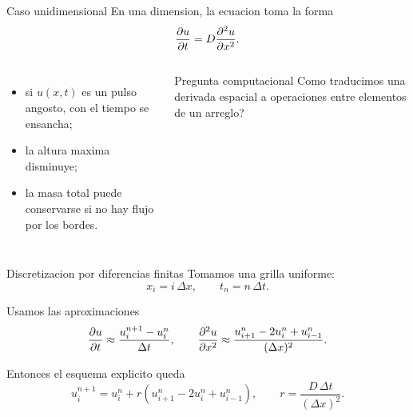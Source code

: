 \begin{frame}{Caso unidimensional}
En una dimension, la ecuacion toma la forma
\[
\pdv{u}{t} = D \pdv[2]{u}{x}.
\]

\begin{columns}[T,onlytextwidth]
\begin{itemize}
    \item si $u(x,t)$ es un pulso angosto, con el tiempo se ensancha;
    \item la altura maxima disminuye;
    \item la masa total puede conservarse si no hay flujo por los bordes.
\end{itemize}

\begin{block}{Pregunta computacional}
\textquestiondown Como traducimos una derivada espacial a operaciones entre elementos de un arreglo?
\end{block}

\end{columns}
\end{frame}

\begin{frame}{Discretizacion por diferencias finitas}
\justifying
Tomamos una grilla uniforme:
\[
x_i = i\,\Delta x, \qquad t_n = n\,\Delta t.
\]

Usamos las aproximaciones
\[
\pdv{u}{t} \approx \frac{u_i^{n+1}-u_i^n}{\Delta t},
\qquad
\pdv[2]{u}{x} \approx \frac{u_{i+1}^n - 2u_i^n + u_{i-1}^n}{(\Delta x)^2}.
\]

Entonces el esquema explicito queda
\[
u_i^{n+1} = u_i^n + r\left(u_{i+1}^n - 2u_i^n + u_{i-1}^n\right),
\qquad
r = \frac{D\,\Delta t}{(\Delta x)^2}.
\]
\end{frame}

